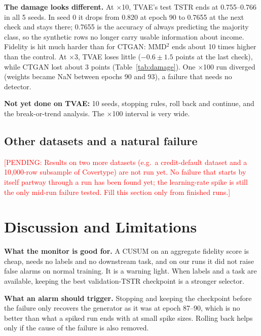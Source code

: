 \documentclass[conference]{IEEEtran}
\newcommand{\pending}[1]{\textcolor{red}{[PENDING: #1]}}
\newcommand{\x}{$\times$}
\begin{document}
\textbf{The damage looks different.} At \x10, TVAE's test TSTR ends at
0.755--0.766 in all 5 seeds. In seed 0 it drops from 0.820 at epoch 90 to
0.7655 at the next check and stays there; 0.7655 is the accuracy of always
predicting the majority class, so the synthetic rows no longer carry usable
information about income. Fidelity is hit much harder than for CTGAN: MMD$^2$
ends about 10 times higher than the control. At \x3, TVAE loses little
($-0.6\pm1.5$ points at the last check), while CTGAN lost about 3 points
(Table~\ref{tab:damage}). One \x100 run diverged (weights became NaN between
epochs 90 and 93), a failure that needs no detector.

\textbf{Not yet done on TVAE:} 10 seeds, stopping rules, roll back and
continue, and the break-or-trend analysis. The \x100 interval is very wide.

\subsection{Other datasets and a natural failure}
\pending{Results on two more datasets (e.g.\ a credit-default dataset and a
10,000-row subsample of Covertype) are not run yet. No failure that starts by
itself partway through a run has been found yet; the learning-rate spike is
still the only mid-run failure tested. Fill this section only from finished
runs.}

\section{Discussion and Limitations}
\textbf{What the monitor is good for.} A CUSUM on an aggregate fidelity score
is cheap, needs no labels and no downstream task, and on our runs it did not
raise false alarms on normal training. It is a warning light. When labels
and a task are available, keeping the best validation-TSTR checkpoint is a
stronger selector.

\textbf{What an alarm should trigger.} Stopping and keeping the checkpoint
before the failure only recovers the generator as it was at epoch 87--90,
which is no better than what a spiked run ends with at small spike sizes.
Rolling back helps only if the cause of the failure is also removed.
\end{document}
